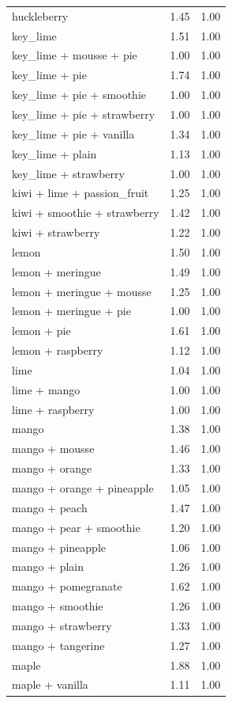 \begin{table}
\begin{tabular}{lrr}
huckleberry & 1.45 & 1.00 \\
key\_lime & 1.51 & 1.00 \\
key\_lime + mousse + pie & 1.00 & 1.00 \\
key\_lime + pie & 1.74 & 1.00 \\
key\_lime + pie + smoothie & 1.00 & 1.00 \\
key\_lime + pie + strawberry & 1.00 & 1.00 \\
key\_lime + pie + vanilla & 1.34 & 1.00 \\
key\_lime + plain & 1.13 & 1.00 \\
key\_lime + strawberry & 1.00 & 1.00 \\
kiwi + lime + passion\_fruit & 1.25 & 1.00 \\
kiwi + smoothie + strawberry & 1.42 & 1.00 \\
kiwi + strawberry & 1.22 & 1.00 \\
lemon & 1.50 & 1.00 \\
lemon + meringue & 1.49 & 1.00 \\
lemon + meringue + mousse & 1.25 & 1.00 \\
lemon + meringue + pie & 1.00 & 1.00 \\
lemon + pie & 1.61 & 1.00 \\
lemon + raspberry & 1.12 & 1.00 \\
lime & 1.04 & 1.00 \\
lime + mango & 1.00 & 1.00 \\
lime + raspberry & 1.00 & 1.00 \\
mango & 1.38 & 1.00 \\
mango + mousse & 1.46 & 1.00 \\
mango + orange & 1.33 & 1.00 \\
mango + orange + pineapple & 1.05 & 1.00 \\
mango + peach & 1.47 & 1.00 \\
mango + pear + smoothie & 1.20 & 1.00 \\
mango + pineapple & 1.06 & 1.00 \\
mango + plain & 1.26 & 1.00 \\
mango + pomegranate & 1.62 & 1.00 \\
mango + smoothie & 1.26 & 1.00 \\
mango + strawberry & 1.33 & 1.00 \\
mango + tangerine & 1.27 & 1.00 \\
maple & 1.88 & 1.00 \\
maple + vanilla & 1.11 & 1.00 \\

\end{tabular}
\end{table}
